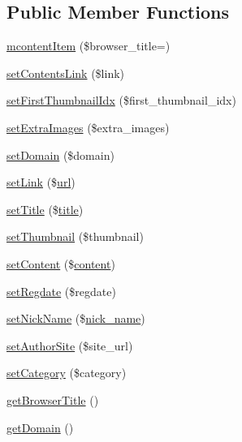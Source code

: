 \subsection*{Public Member Functions}
\begin{DoxyCompactItemize}
\item 
\hyperlink{classmcontentItem_a9cf9b439a6c29b1354b298ab6023ea3e}{mcontent\+Item} (\$browser\+\_\+title=\textquotesingle{}\textquotesingle{})
\item 
\hyperlink{classmcontentItem_a8d8267fc8c63ad032d8dfa694b54d30b}{set\+Contents\+Link} (\$link)
\item 
\hyperlink{classmcontentItem_a97b29510d9386112296071cb06bd68dd}{set\+First\+Thumbnail\+Idx} (\$first\+\_\+thumbnail\+\_\+idx)
\item 
\hyperlink{classmcontentItem_a9907cf978c2b2dafbaeb307faea0874d}{set\+Extra\+Images} (\$extra\+\_\+images)
\item 
\hyperlink{classmcontentItem_adaf816a617e10b21c1b7cfa3080e4a25}{set\+Domain} (\$domain)
\item 
\hyperlink{classmcontentItem_a6c192aee58d7bca3d8933d387309b2ab}{set\+Link} (\$\hyperlink{swfupload_8js_a440a52a9004fdab0700100a6ddb49f67}{url})
\item 
\hyperlink{classmcontentItem_adb687bee610481753feb8bdd14fab049}{set\+Title} (\$\hyperlink{ko_8install_8php_a5b072c5fd1d2228c6ba5cee13cd142e3}{title})
\item 
\hyperlink{classmcontentItem_a956c763f26136b4e7a96ab07c04a1957}{set\+Thumbnail} (\$thumbnail)
\item 
\hyperlink{classmcontentItem_afb9763a013942bd40ab5a3b1c7491910}{set\+Content} (\$\hyperlink{classcontent}{content})
\item 
\hyperlink{classmcontentItem_aeb646f2283bfb0a13b7d9f544058f962}{set\+Regdate} (\$regdate)
\item 
\hyperlink{classmcontentItem_a4b702963538643aac56d9a3312a06bee}{set\+Nick\+Name} (\$\hyperlink{ko_8install_8php_a151ecae87a1f3d7e257aa089803086bd}{nick\+\_\+name})
\item 
\hyperlink{classmcontentItem_adaa9ad60dd8f5373b9f2258a6effe70c}{set\+Author\+Site} (\$site\+\_\+url)
\item 
\hyperlink{classmcontentItem_a004c63ef8da549d29d201b4946372c5e}{set\+Category} (\$category)
\item 
\hyperlink{classmcontentItem_a6fe964acc2f33039f90a6ed33ae03ba9}{get\+Browser\+Title} ()
\item 
\hyperlink{classmcontentItem_a29a4fb4f4bedd748ec93238be37a22fb}{get\+Domain} ()

\end{DoxyCompactItemize}
